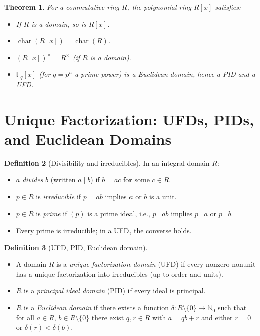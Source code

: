 \documentclass[12pt,a4paper]{amsart}
\newtheorem{theorem}{Theorem}[section]
\theoremstyle{definition}
\newtheorem{definition}[theorem]{Definition}
\theoremstyle{definition}
\DeclareMathOperator{\chr}{char}
\begin{document}
\begin{theorem}
For a commutative ring $R$, the polynomial ring $R[x]$ satisfies:
\begin{itemize}
  \item If $R$ is a domain, so is $R[x]$.
  \item $\chr(R[x]) = \chr(R)$.
  \item $(R[x])^\times = R^\times$ (if $R$ is a domain).
  \item $\mathbb{F}_q[x]$ (for $q = p^n$ a prime power) is a Euclidean domain,
        hence a PID and a UFD.
\end{itemize}
\end{theorem}

\section{Unique Factorization: UFDs, PIDs, and Euclidean Domains}

\begin{definition}[Divisibility and irreducibles]
In an integral domain $R$:
\begin{itemize}
  \item $a$ \emph{divides} $b$ (written $a \mid b$) if $b = ac$ for some $c \in R$.
  \item $p \in R$ is \emph{irreducible} if $p = ab$ implies $a$ or $b$ is a unit.
  \item $p \in R$ is \emph{prime} if $(p)$ is a prime ideal, i.e., $p \mid ab$ implies
        $p \mid a$ or $p \mid b$.
  \item Every prime is irreducible; in a UFD, the converse holds.
\end{itemize}
\end{definition}

\begin{definition}[UFD, PID, Euclidean domain]
\begin{itemize}
  \item A domain $R$ is a \emph{unique factorization domain} (UFD) if every nonzero
        nonunit has a unique factorization into irreducibles (up to order and units).
  \item $R$ is a \emph{principal ideal domain} (PID) if every ideal is principal.
  \item $R$ is a \emph{Euclidean domain} if there exists a function
        $\delta\colon R \setminus \{0\} \to \mathbb{N}_0$ such that for all
        $a \in R$, $b \in R \setminus \{0\}$ there exist $q, r \in R$ with
        $a = qb + r$ and either $r = 0$ or $\delta(r) < \delta(b)$.
\end{itemize}
\end{definition}
\end{document}
